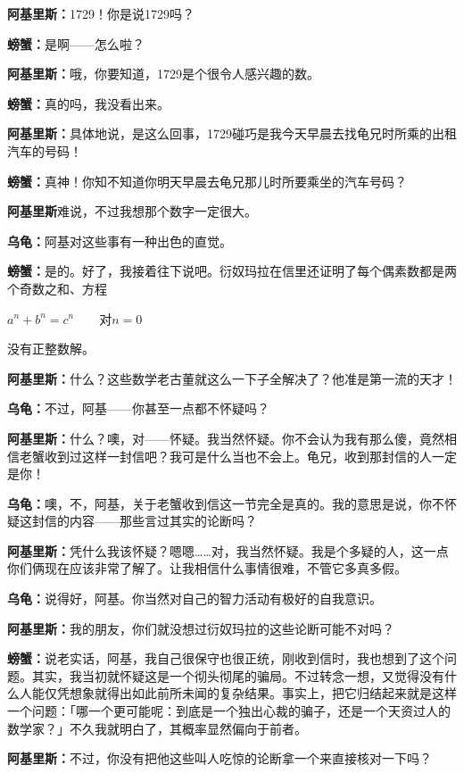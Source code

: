 \documentclass[
  12pt,
  twoside,
  openright,
  oldfontcommands,
]{memoir}
\newcommand{\dialogname}[1]{{\heifamily\bfseries #1}}
\begin{document}
\dialogname{阿基里斯：}1729！你是说1729吗？

\dialogname{螃蟹：}是啊------怎么啦？

\dialogname{阿基里斯：}哦，你要知道，1729是个很令人感兴趣的数。

\dialogname{螃蟹：}真的吗，我没看出来。

\dialogname{阿基里斯：}具体地说，是这么回事，1729碰巧是我今天早晨去找龟兄时所乘的出租汽车的号码！

\dialogname{螃蟹：}真神！你知不知道你明天早晨去龟兄那儿时所要乘坐的汽车号码？

\dialogname{阿基里斯}难说，不过我想那个数字一定很大。

\dialogname{乌龟：}阿基对这些事有一种出色的直觉。

\dialogname{螃蟹：}是的。好了，我接着往下说吧。衍奴玛拉在信里还证明了每个偶素数都是两个奇数之和、方程

$a^n+b^n=c^n$　　对$n=0$

没有正整数解。

\dialogname{阿基里斯：}什么？这些数学老古董就这么一下子全解决了？他准是第一流的天才！

\dialogname{乌龟：}不过，阿基------你甚至一点都不怀疑吗？

\dialogname{阿基里斯：}什么？噢，对------怀疑。我当然怀疑。你不会认为我有那么傻，竟然相信老蟹收到过这样一封信吧？我可是什么当也不会上。龟兄，收到那封信的人一定是你！

\dialogname{乌龟：}噢，不，阿基，关于老蟹收到信这一节完全是真的。我的意思是说，你不怀疑这封信的内容------那些言过其实的论断吗？

\dialogname{阿基里斯：}凭什么我该怀疑？嗯嗯\ldots\ldots 对，我当然怀疑。我是个多疑的人，这一点你们俩现在应该非常了解了。让我相信什么事情很难，不管它多真多假。

\dialogname{乌龟：}说得好，阿基。你当然对自己的智力活动有极好的自我意识。

\dialogname{阿基里斯：}我的朋友，你们就没想过衍奴玛拉的这些论断可能不对吗？

\dialogname{螃蟹：}说老实话，阿基，我自己很保守也很正统，刚收到信时，我也想到了这个问题。其实，我当初就怀疑这是一个彻头彻尾的骗局。不过转念一想，又觉得没有什么人能仅凭想象就得出如此前所未闻的复杂结果。事实上，把它归结起来就是这样一个问题：「哪一个更可能呢：到底是一个独出心裁的骗子，还是一个天资过人的数学家？」不久我就明白了，其概率显然偏向于前者。

\dialogname{阿基里斯：}不过，你没有把他这些叫人吃惊的论断拿一个来直接核对一下吗？
\end{document}
